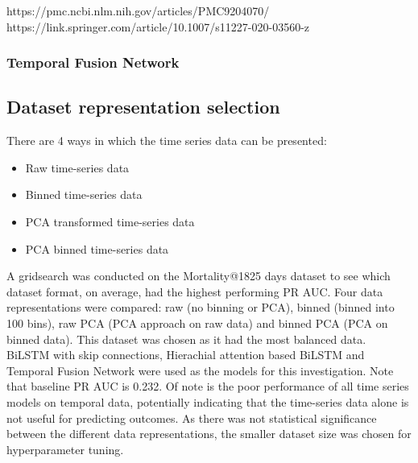 \documentclass{article}
\begin{document}
https://pmc.ncbi.nlm.nih.gov/articles/PMC9204070/
https://link.springer.com/article/10.1007/s11227-020-03560-z

\subsubsection{Temporal Fusion Network}


\subsection{Dataset representation selection}

There are 4 ways in which the time series data can be presented:

\begin{itemize}
    \item Raw time-series data
    \item Binned time-series data
    \item PCA transformed time-series data
    \item PCA binned time-series data
\end{itemize}

A gridsearch was conducted on the Mortality@1825 days dataset to see which dataset format, on average, had the highest performing PR AUC. Four data representations were compared: raw (no binning or PCA), binned (binned into 100 bins), raw PCA (PCA approach on raw data) and binned PCA (PCA on binned data). This dataset was chosen as it had the most balanced data. BiLSTM with skip connections, Hierachial attention based BiLSTM and Temporal Fusion Network were used as the models for this investigation. Note that baseline PR AUC is 0.232. Of note is the poor performance of all time series models on temporal data, potentially indicating that the time-series data alone is not useful for predicting outcomes. As there was not statistical significance between the different data representations, the smaller dataset size was chosen for hyperparameter tuning.
\end{document}
